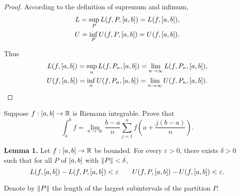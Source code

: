 \begin{proof}
    According to the definition of supremum and infimum,
    \[
        \begin{split}
            L = \sup\limits_{P}L(f, P, \left[{a, b}\right]) = L(f, \left[{a, b}\right]), \\
            U = \inf\limits_{P}U(f, P, \left[{a, b}\right]) = U(f, \left[{a, b}\right]).
        \end{split}
    \]

    Thus
    \[
        \begin{split}
            L(f, \left[{a, b}\right]) = \sup\limits_{n}L(f, P_{n}, \left[{a, b}\right]) = \lim\limits_{n\to\infty}L(f, P_{n}, \left[{a, b}\right]), \\
            U(f, \left[{a, b}\right]) = \inf\limits_{n}U(f, P_{n}, \left[{a, b}\right]) = \lim\limits_{n\to\infty}U(f, P_{n}, \left[{a, b}\right]).
        \end{split}
    \]
\end{proof}
\newpage

\begin{exercise}\label{chapter1:sectionA:exercise8}
    Suppose $f: \left[{a, b}\right]\to\mathbb{R}$ is Riemann integrable. Prove that
    \[
        \int^{b}_{a}f = \lim\limits_{n\to\infty}\frac{b-a}{n}\sum^{n}_{j=1}f\left(a + \frac{j(b-a)}{n}\right).
    \]
\end{exercise}

\noindent\textbf{Lemma 1.} Let $f: \left[{a, b}\right]\to\mathbb{R}$ be bounded. For every $\varepsilon > 0$, there exists $\delta > 0$ such that for all $P$ of $\left[{a,b}\right]$ with $\left\Vert{P}\right\Vert < \delta$,
\[
    L(f, \left[{a, b}\right]) - L(f, P, \left[{a, b}\right]) < \varepsilon
    \qquad
    U(f, P, \left[{a, b}\right]) - U(f, \left[{a, b}\right]) < \varepsilon.
\]

\noindent Denote by $\left\Vert{P}\right\Vert$ the length of the largest subintervals of the partition $P$.

